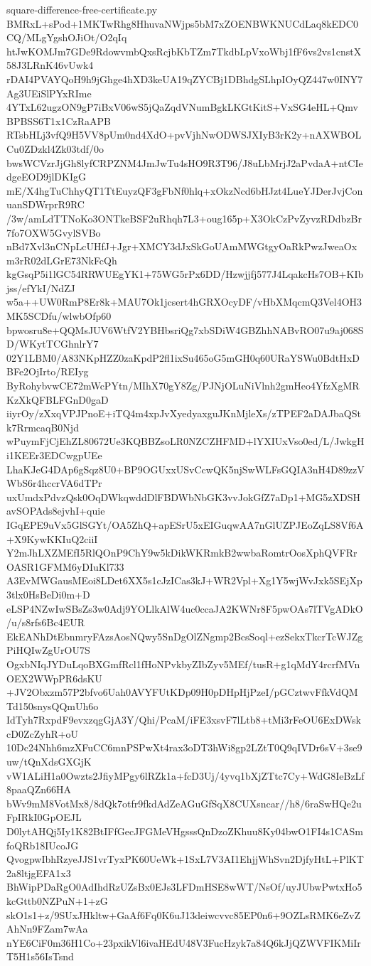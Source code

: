 \documentclass[11pt]{article}
\theoremstyle{definition}
\theoremstyle{remark}
\begin{document}
\begin{filecontents*}[overwrite]{square-difference-free-certificate.py}
BMRxL+sPod+1MKTwRhg8HhuvaNWjps5bM7xZOENBWKNUCdLaq8kEDC0CQ/MLgYgshOJiOt/O2qIq
htJwKOMJm7GDe9RdowvmbQxsRcjbKbTZm7TkdbLpVxoWbj1fF6vs2vs1cnstX58J3LRnK46vUwk4
rDAI4PVAYQoH9h9jGhge4hXD3keUA19qZYCBj1DBhdgSLhpIOyQZ447w0INY7Ag3UEiSlPYxRIme
4YTxL62ugzON9gP7iBxV06wS5jQaZqdVNumBgkLKGtKitS+VxSG4eHL+QmvBPBSS6T1x1CzRaAPB
RTsbHLj3vfQ9H5VV8pUm0nd4XdO+pvVjhNwODWSJXIyB3rK2y+nAXWBOLCu0ZDzkl4Zk03tdf/0o
bwsWCVzrJjGh8lyfCRPZNM4JmJwTu4sHO9R3T96/J8uLbMrjJ2aPvdaA+ntCIedgeEOD9jlDKIgG
mE/X4hgTuChhyQT1TtEuyzQF3gFbNf0hlq+xOkzNcd6bHJzt4LueYJDerJvjConuanSDWrprR9RC
/3w/amLdTTNoKo3ONTkeBSF2uRhqh7L3+oug165p+X3OkCzPvZyvzRDdbzBr7fo7OXW5GvylSVBo
nBd7Xvl3nCNpLcUHfJ+Jgr+XMCY3dJxSkGoUAmMWGtgyOaRkPwzJweaOxm3rR02dLGrE73NkFcQh
kgGsqP5i1lGC54RRWUEgYK1+75WG5rPx6DD/Hzwjjfj577J4LqakcHs7OB+KIbjss/efYkI/NdZJ
w5a++UW0RmP8Er8k+MAU7Ok1jcsert4hGRXOcyDF/vHbXMqcmQ3Vel4OH3MK5SCDfu/wlwbOfp60
bpwosru8e+QQMsJUV6WtfV2YBHbsriQg7xbSDiW4GBZhhNABvRO07u9aj068SD/WKytTCGhnlrY7
02Y1LBM0/A83NKpHZZ0zaKpdP2fl1ixSu465oG5mGH0q60URaYSWu0BdtHxDBFe2OjIrto/REIyg
ByRohybvwCE72mWcPYtn/MIhX70gY8Zg/PJNjOLuNiVlnh2gmHeo4YfzXgMRKzXkQFBLFGnD0gaD
iiyrOy/zXxqVPJPnoE+iTQ4m4xpJvXyedyaxguJKnMjleXs/zTPEF2aDAJbaQStk7RrmcaqB0Njd
wPuymFjCjEhZL80672Ue3KQBBZsoLR0NZCZHFMD+lYXIUxVso0ed/L/JwkgHi1KEEr3EDCwgpUEe
LhaKJeG4DAp6gSqz8U0+BP9OGUxxUSvCcwQK5njSwWLFsGQIA3nH4D89zzVWbS6r4hccrVA6dTPr
uxUmdxPdvzQsk0OqDWkqwddDlFBDWbNbGK3vvJokGfZ7aDp1+MG5zXDSHavSOPAds8ejvhI+quie
IGqEPE9uVx5GlSGYt/OA5ZhQ+apESrU5xEIGuqwAA7nGlUZPJEoZqLS8Vf6A+X9KywKKIuQ2ciiI
Y2mJhLXZMEfI5RlQOnP9ChY9w5kDikWKRmkB2wwbaRomtrOosXphQVFRrOASR1GFMM6yDIuKl733
A3EvMWGausMEoi8LDet6XX5s1cJzICas3kJ+WR2Vpl+Xg1Y5wjWvJxk5SEjXp3tlx0HsBeDi0m+D
eLSP4NZwIwSBsZs3w0Adj9YOLlkAlW4uc0ccaJA2KWNr8F5pwOAs7lTVgADkO/u/s8rfs6Bc4EUR
EkEANhDtEbnmryFAzsAosNQwy5SnDgOlZNgmp2BcsSoql+ezSekxTkcrTcWJZgPiHQIwZgUrOU7S
OgxbNIqJYDuLqoBXGmfRcl1fHoNPvkbyZIbZyv5MEf/tusR+g1qMdY4rcrfMVnOEX2WWpPR6dsKU
+JV2Obxzm57P2bfvo6Uah0AVYFUtKDp09H0pDHpHjPzeI/pGCztwvFfkVdQMTd150snysQQmUh6o
IdTyh7RxpdF9evxzqgGjA3Y/Qhi/PcaM/iFE3xsvF7lLtb8+tMi3rFeOU6ExDWskcD0ZcZyhR+oU
10Dc24Nhh6mzXFuCC6mnPSPwXt4rax3oDT3hWi8gp2LZtT0Q9qIVDr6sV+3se9uw/tQnXdsGXGjK
vW1ALiH1a0Owzts2JfiyMPgy6lRZk1a+fcD3Uj/4yvq1bXjZTtc7Cy+WdG8IeBzLf8paaQZn66HA
bWv9mM8VotMx8/8dQk7otfr9fkdAdZeAGuGfSqX8CUXsncar//h8/6raSwHQe2uFpIRkI0GpOEJL
D0lytAHQj5Iy1K82BtIFfGecJFGMeVHgsssQnDzoZKhuu8Ky04bwO1FI4s1CASmfoQRb18IUcoJG
QvogpwIbhRzyeJJS1vrTyxPK60UeWk+1SxL7V3AI1EhjjWhSvn2DjfyHtL+PlKT2a8ltjgEFA1x3
BhWipPDaRgO0AdIhdRzUZsBx0EJs3LFDmHSE8wWT/NsOf/uyJUbwPwtxHo5kcGttb0NZPuN+1+zG
skO1s1+z/9SUxJHkltw+GaAf6Fq0K6uJ13deiwcvvc85EP0n6+9OZLsRMK6eZvZAhNn9FZam7wAa
nYE6CiF0m36H1Co+23pxikVl6ivaHEdU48V3FucHzyk7a84Q6kJjQZWVFIKMiIrT5H1s56IsTsnd

\end{filecontents*}
\end{document}

